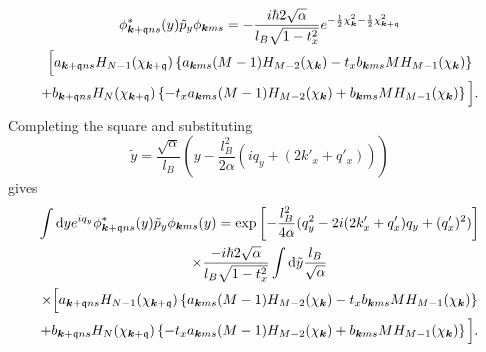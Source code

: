\begin{multline}
  \phi ^{*} _{\bm{k} + \mathfrak{q} ns} (y) \tilde{p}_{y} \phi _{\bm{k} m s}
  = -\frac{i\hbar 2 \sqrt{\alpha } }{l_{B} \sqrt{1 - t_{x}^2} }
  e^{-\frac{1}{2} \chi _{\bm{k}}^2 - \frac{1}{2} \chi _{\bm{k} + \mathfrak{q}} ^2}\\
  \Big[
  a_{\bm{k} + \mathfrak{q} ns} H_{N-1}(\chi_{\bm{k}+\mathfrak{q}})
  \left\{a_{\bm{k} ms} (M-1) H_{M-2} (\chi_{\bm{k}}) - t_{x} b_{\bm{k} ms} M H_{M-1} (\chi_{\bm{k}})\right\}\\
  +
  b_{\bm{k} + \mathfrak{q} ns} H_{N} (\chi_{\bm{k} + \mathfrak{q}})
  \left\{-t_{x} a_{\bm{k} ms} (M-1) H_{M-2} (\chi_{\bm{k}}) + b_{\bm{k} ms} M H_{M-1} (\chi_{\bm{k}})\right\}
  \Big].
\end{multline}
Completing the square and substituting
\[
  \tilde{y} = \frac{\sqrt{ \alpha  }}{l_{B}}
  \left(y - \frac{l_{B}^2}{2 \alpha } (i q_{y} + (2 k'_x + q' _x) ) \right)
\]
gives
\begin{multline}
  \int \mathrm{d}y
  e^{i q_{y}}
  \phi ^{*}_{\bm{k} + \mathfrak{q} ns}(y) \tilde{p}_{y}
  \phi_{\bm{k} ms} (y)
  =
  \exp
  \left[
    - \frac{l_{B}^2}{4 \alpha } (q_{y}^2 - 2 i (2k' _x + q' _x) q_{y} + (q' _x)^2 )
  \right  ]\\
\times\frac{ - i\hbar 2 \sqrt{\alpha} }{l_{B} \sqrt{1 - t_{x}^2} }
  \int \mathrm{d} \tilde{y} \frac{l_{B}}{\sqrt{\alpha } }\\
\times  \Big[
  a_{\bm{k} + \mathfrak{q} ns} H_{N-1}( \chi _{\bm{k} + \mathfrak{q}} )
  \left\{
    a_{\bm{k} ms} (M-1) H_{M-2} ( \chi _{\bm{k}} )
    - t_{x} b_{\bm{k} ms} M H_{M-1} ( \chi _{\bm{k}} ) \right\}\\
  +
  b_{\bm{k} + \mathfrak{q} ns} H_{N} ( \chi _{\bm{k} + \mathfrak{q}} )
  \left\{
    -t_{x} a_{\bm{k} ms} (M-1) H_{M-2} ( \chi _{\bm{k}} )
    + b_{\bm{k} ms} M H_{M-1} ( \chi _{\bm{k}} )
  \right\}
  \Big].
\end{multline}

